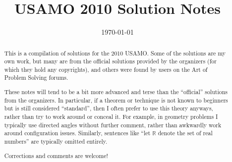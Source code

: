 \documentclass[11pt]{scrartcl}
\title{USAMO 2010 Solution Notes}
\date{\today}
\begin{document}
\maketitle

\begin{abstract}
This is a compilation of solutions
for the 2010 USAMO.
Some of the solutions are my own work,
but many are from the official solutions provided by the organizers
(for which they hold any copyrights),
and others were found by users on the Art of Problem Solving forums.

These notes will tend to be a bit more advanced and terse than the ``official''
solutions from the organizers.
In particular, if a theorem or technique is not known to beginners
but is still considered ``standard'', then I often prefer to
use this theory anyways, rather than try to work around or conceal it.
For example, in geometry problems I typically use directed angles
without further comment, rather than awkwardly work around configuration issues.
Similarly, sentences like ``let $\mathbb{R}$ denote the set of real numbers''
are typically omitted entirely.

Corrections and comments are welcome!
\end{abstract}

\tableofcontents
\newpage

\addtocounter{section}{-1}
\end{document}
